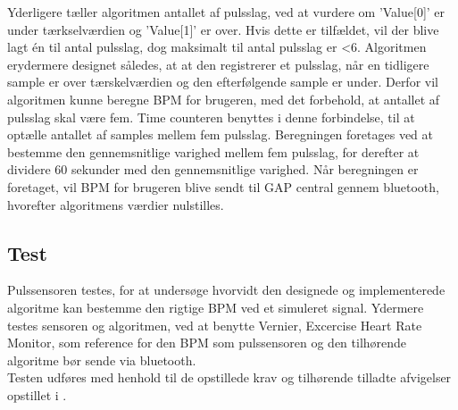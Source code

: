 Yderligere tæller algoritmen antallet af pulsslag, ved at vurdere om 'Value[0]' er under tærkselværdien og 'Value[1]' er over. Hvis dette er tilfældet, vil der blive lagt én til antal pulsslag, dog maksimalt til antal pulsslag er <6. Algoritmen erydermere designet således, at at den registrerer et pulsslag, når en tidligere sample er over tærskelværdien og den efterfølgende sample er under. Derfor vil algoritmen kunne beregne BPM for brugeren, med det forbehold, at antallet af pulsslag skal være fem. Time counteren benyttes i denne forbindelse, til at optælle antallet af samples mellem fem pulsslag. Beregningen foretages ved at bestemme den gennemsnitlige varighed mellem fem pulsslag, for derefter at dividere 60 sekunder med den gennemsnitlige varighed. Når beregningen er foretaget, vil BPM for brugeren blive sendt til GAP central gennem bluetooth, hvorefter algoritmens værdier nulstilles.


\subsection{Test}
Pulssensoren testes, for at undersøge hvorvidt den designede og implementerede algoritme kan bestemme den rigtige BPM ved et simuleret signal. Ydermere testes sensoren og algoritmen, ved at benytte Vernier, Excercise Heart Rate Monitor, som reference for den BPM som pulssensoren og den tilhørende algoritme bør sende via bluetooth. \\
Testen udføres med henhold til de opstillede krav og tilhørende tilladte afvigelser opstillet i .

